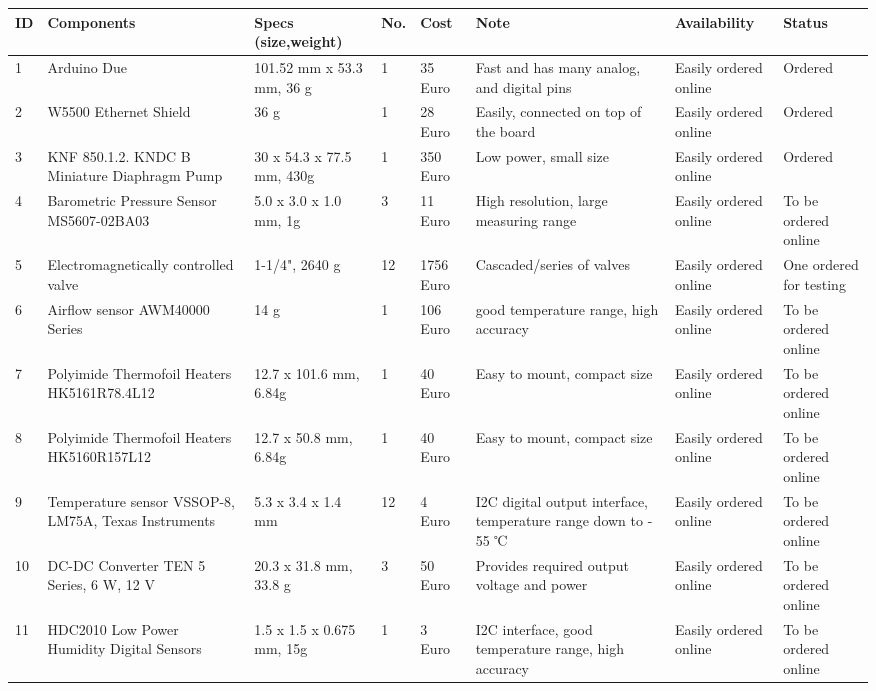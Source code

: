 


\begin{longtable}{|m{}|m{}|m{}|m{}|m{}|m{}|m{}|m{}|}
    
\hline
\textbf{ID} & \textbf{Components} & \textbf{Specs (size,weight)} & \textbf{No.} & \textbf{Cost} & \textbf{Note} & \textbf{Availability} & \textbf{Status} \\ 
\hline
1 & Arduino Due & 101.52 mm x 53.3 mm, 36 g & 1 & 35 Euro & Fast and has many analog, and digital pins & Easily ordered online & Ordered \\ \hline
2 & W5500 Ethernet Shield  & 36 g & 1 & 28 Euro & Easily, connected on top of the board & Easily ordered online & Ordered \\ \hline
3 & KNF 850.1.2. KNDC B Miniature Diaphragm Pump & 30 x 54.3 x 77.5 mm, 430g  & 1 & 350 Euro & Low power, small size & Easily ordered online & Ordered \\ \hline
4 & Barometric Pressure Sensor MS5607-02BA03 & 5.0 x 3.0 x 1.0 mm, 1g  & 3 &  11 Euro & High resolution, large measuring range & Easily ordered online & To be ordered online \\ \hline
5 & Electromagnetically controlled valve & 1-1/4", 2640 g & 12 & 1756 Euro & Cascaded/series of valves & Easily ordered online & One ordered for testing \\ \hline
6 & Airflow sensor AWM40000 Series & 14 g & 1 & 106 Euro & good temperature range, high accuracy & Easily ordered online & To be ordered online \\ \hline
7 & Polyimide Thermofoil Heaters HK5161R78.4L12 & 12.7 x 101.6 mm, 6.84g & 1 & 40 Euro & Easy to mount, compact size & Easily ordered online & To be ordered online \\ \hline
8 & Polyimide Thermofoil Heaters HK5160R157L12 & 12.7 x 50.8 mm, 6.84g & 1 & 40 Euro & Easy to mount, compact size & Easily ordered online & To be ordered online \\ \hline
9 & Temperature sensor VSSOP-8, LM75A, Texas Instruments & 5.3 x 3.4 x 1.4 mm & 12 & 4 Euro & I2C digital output interface, temperature range down to - 55 ℃ & Easily ordered online & To be ordered online \\ \hline
10 & DC-DC Converter TEN 5 Series, 6 W, 12 V & 20.3 x 31.8 mm, 33.8 g & 3 & 50 Euro & Provides required output voltage and power & Easily ordered online & To be ordered online \\ \hline
11 & HDC2010 Low Power Humidity Digital Sensors & 1.5 x 1.5 x 0.675 mm, 15g & 1 & 3 Euro & I2C interface, good temperature range, high accuracy & Easily ordered online & To be ordered online \\ \hline

\end{longtable}
